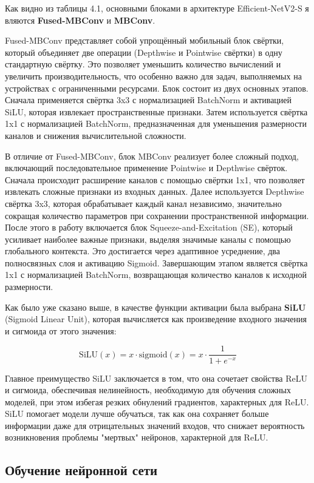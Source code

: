 {Как видно из таблицы 4.1, основными блоками в архитектуре Efficient-NetV2-S я вляются \textbf{Fused-MBConv} и \textbf{MBConv}.

Fused-MBConv представляет собой упрощённый мобильный блок свёртки, который объединяет две операции (Depthwise и Pointwise свёртки) в одну стандартную свёртку. Это позволяет уменьшить количество вычислений и увеличить производительность, что особенно важно для задач, выполняемых на устройствах с ограниченными ресурсами. Блок состоит из двух основных этапов. Сначала применяется свёртка 3x3 с нормализацией BatchNorm и активацией SiLU, которая извлекает пространственные признаки. Затем используется свёртка 1x1 с нормализацией BatchNorm, предназначенная для уменьшения размерности каналов и снижения вычислительной сложности.

В отличие от Fused-MBConv, блок MBConv реализует более сложный подход, включающий последовательное применение Pointwise и Depthwise свёрток. Сначала происходит расширение каналов с помощью свёртки 1x1, что позволяет извлекать сложные признаки из входных данных. Далее используется Depthwise свёртка 3x3, которая обрабатывает каждый канал независимо, значительно сокращая количество параметров при сохранении пространственной информации. После этого в работу включается блок Squeeze-and-Excitation (SE), который усиливает наиболее важные признаки, выделяя значимые каналы с помощью глобального контекста. Это достигается через адаптивное усреднение, два полносвязных слоя и активацию Sigmoid. Завершающим этапом является свёртка 1x1 с нормализацией BatchNorm, возвращающая количество каналов к исходной размерности.


Как было уже сказано выше, в качестве функции активации была выбрана \textbf{SiLU} (Sigmoid Linear Unit), которая вычисляется как произведение входного значения и сигмоида от этого значения:  

\[
\text{SiLU}(x) = x \cdot \text{sigmoid}(x) = x \cdot \frac{1}{1 + e^{-x}}
\]

Главное преимущество SiLU заключается в том, что она сочетает свойства ReLU и сигмоида, обеспечивая нелинейность, необходимую для обучения сложных моделей, при этом избегая резких обнулений градиентов, характерных для ReLU. SiLU помогает модели лучше обучаться, так как она сохраняет больше информации даже для отрицательных значений входов, что снижает вероятность возникновения проблемы "мертвых" нейронов, характерной для ReLU. 

\subsection{Обучение нейронной сети}

}
